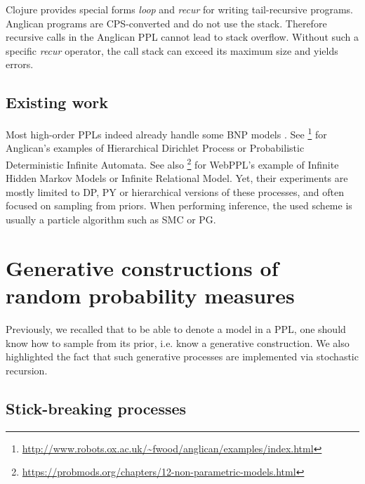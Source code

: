 Clojure provides special forms \emph{loop} and \emph{recur} for writing tail-recursive programs. Anglican programs are \gls{CPS}-converted and do not use the stack. Therefore recursive calls in the Anglican \gls{PPL} cannot lead to stack overflow.
Without such a specific \emph{recur} operator, the call stack can exceed its maximum size and yields errors.

\subsection{Existing work}

Most high-order \glspl{PPL} indeed already handle some \gls{BNP} models \cite{Goodman:2012uq,wood-aistats-2014,probmods2}.
See \footnote{\url{http://www.robots.ox.ac.uk/~fwood/anglican/examples/index.html}} for Anglican's examples of Hierarchical Dirichlet Process or Probabilistic Deterministic Infinite Automata. See also \footnote{\url{https://probmods.org/chapters/12-non-parametric-models.html}} for WebPPL's example of Infinite Hidden Markov Models or Infinite Relational Model.
Yet, their experiments are mostly limited to \acrlong{DP}, \acrlong{PY} or hierarchical versions of these processes, and often focused on sampling from priors. When performing inference,
the used scheme is usually a particle algorithm such as \acrlong{SMC} or \acrlong{PG}.


\section{Generative constructions of random probability measures} \label{SBS}
Previously, we recalled that to be able to denote a model in a \gls{PPL}, one should know how to sample from its prior, i.e. know a generative construction.
We also highlighted the fact that such generative processes are implemented via stochastic recursion.

\subsection{Stick-breaking processes} \label{stick-breaking}

